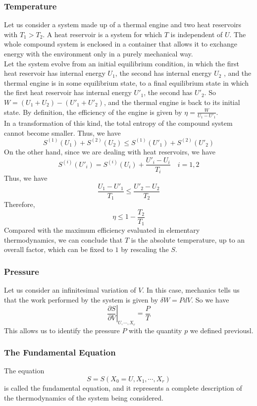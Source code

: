 \documentclass[cyan]{elegantnote}
\begin{document}
\subsubsection{Temperature}
Let us consider a system made up of a thermal engine and two heat reservoirs with $T_1 > T_2$. A heat reservoir is a system for which $T$ is independent of $U$. The whole compound system is enclosed in a container that allows it to exchange energy with the environment only in a purely mechanical way. 
\\
Let the system evolve from an initial equilibrium condition, in which the first heat reservoir has internal energy $U_1$, the second has internal energy $U_2$ , and the thermal engine is in some equilibrium state, to a final equilibrium state in which the first heat reservoir has internal energy $U'_1$, the second has $U'_2$. So $W = (U_1 + U_2 ) - (U'_1 + U'_2)$, and the thermal engine is back to its initial state. By definition, the efficiency of the engine is given by $\eta = \frac{W}{U_1 - U'_1}$.
\\
In a transformation of this kind, the total entropy of the compound system cannot become smaller. Thus, we have
\[S^{(1)}(U_1) + S^{(2)}(U_2) \leq S^{(1)}(U'_1) + S^{(2)}(U'_2)\]
On the other hand, since we are dealing with heat reservoirs, we have
\[S^{(i)}(U'_i) = S^{(i)}(U_i) + \frac{U'_i - U_i}{T_i} \quad i = 1,2\]
Thus, we have
\[\frac{U_1 - U'_1}{T_1} \leq \frac{U'_2 - U_2}{T_2}\]
Therefore,
\[\eta \leq 1 - \frac{T_2}{T_1}\]
Compared with the maximum efficiency evaluated in elementary thermodynamics, we can conclude that $T$ is the absolute temperature, up to an overall factor, which can be fixed to $1$ by rescaling the $S$. 

\subsubsection{Pressure}
Let us consider an infinitesimal variation of $V$. In this case, mechanics tells us that the work performed by the system is given by $\delta W = PdV$. So we have
\[\left. \frac{\partial S}{\partial V} \right|_{U,\cdots,X_r} = \frac{P}{T}\]
This allows us to identify the pressure $P$ with the quantity $p$ we defined previousl.


\subsubsection{The Fundamental Equation}
The equation
\[S = S(X_0 = U, X_1, \cdots, X_r)\]
is called the fundamental equation, and it represents a complete description of the thermodynamics of the system being considered.
\end{document}
